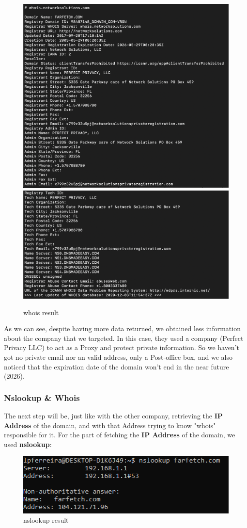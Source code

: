 \begin{figure}[ht!]
 	\centering
 	\includegraphics[width=.62\linewidth]{img/whois2.png}
 	\includegraphics[width=.62\linewidth]{img/whois3.png}
 	\caption{whois result}
\end{figure}


As we can see, despite having more data returned, we obtained less information about the company that we targeted. In this case, they used a company (Perfect Privacy LLC) to act as a Proxy and protect private information. So we haven't got no private email nor an valid address, only a Post-office box, and we also noticed that the expiration date of the domain won't end in the near future (2026). 

\subsubsection{Nslookup \& Whois}
The next step will be, just like with the other company, retrieving the \textbf{IP Address} of the domain, and with that Address trying to know "whois" responsible for it. For the part of fetching the \textbf{IP Address} of the domain, we used \textbf{nslookup}:

\begin{figure}[ht!]
 	\centering
 	\includegraphics[width=.5\linewidth]{img/nslookupfarfetch.PNG}
 	\caption{nslookup result}
\end{figure}


